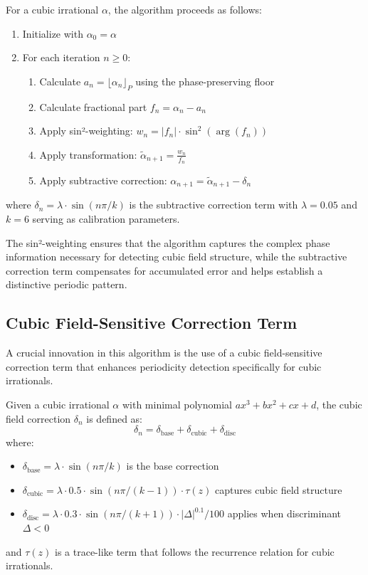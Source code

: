\begin{algorithm_def}
For a cubic irrational $\alpha$, the algorithm proceeds as follows:
\begin{enumerate}
    \item Initialize with $\alpha_0 = \alpha$
    \item For each iteration $n \geq 0$:
    \begin{enumerate}
        \item Calculate $a_n = \lfloor \alpha_n \rfloor_P$ using the phase-preserving floor
        \item Calculate fractional part $f_n = \alpha_n - a_n$
        \item Apply sin²-weighting: $w_n = |f_n| \cdot \sin^2(\arg(f_n))$
        \item Apply transformation: $\tilde{\alpha}_{n+1} = \frac{w_n}{f_n}$
        \item Apply subtractive correction: $\alpha_{n+1} = \tilde{\alpha}_{n+1} - \delta_n$
    \end{enumerate}
\end{enumerate}
where $\delta_n = \lambda \cdot \sin(n\pi/k)$ is the subtractive correction term with $\lambda = 0.05$ and $k = 6$ serving as calibration parameters.
\end{algorithm_def}

The sin²-weighting ensures that the algorithm captures the complex phase information necessary for detecting cubic field structure, while the subtractive correction term compensates for accumulated error and helps establish a distinctive periodic pattern.

\subsection{Cubic Field-Sensitive Correction Term}

A crucial innovation in this algorithm is the use of a cubic field-sensitive correction term that enhances periodicity detection specifically for cubic irrationals.

\begin{definition}
Given a cubic irrational $\alpha$ with minimal polynomial $ax^3 + bx^2 + cx + d$, the cubic field correction $\delta_n$ is defined as:
\begin{equation}
\delta_n = \delta_{\text{base}} + \delta_{\text{cubic}} + \delta_{\text{disc}}
\end{equation}
where:
\begin{itemize}
    \item $\delta_{\text{base}} = \lambda \cdot \sin(n\pi/k)$ is the base correction
    \item $\delta_{\text{cubic}} = \lambda \cdot 0.5 \cdot \sin(n\pi/(k-1)) \cdot \tau(z)$ captures cubic field structure
    \item $\delta_{\text{disc}} = \lambda \cdot 0.3 \cdot \sin(n\pi/(k+1)) \cdot |\Delta|^{0.1}/100$ applies when discriminant $\Delta < 0$
\end{itemize}
and $\tau(z)$ is a trace-like term that follows the recurrence relation for cubic irrationals.
\end{definition}

